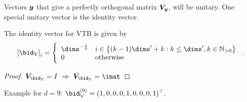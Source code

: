 Vectors $\bm{y}$ that give a perfectly orthogonal matrix $\bm{V}_{\bm{y}}$, will be unitary.
One special unitary vector is the identity vector.
\begin{corollary}
    The identity vector for VTB is given by
    \begin{equation}
        \sbr{\bid_{\ped{V}}}_i = \left\{ \begin{array}{ll}
                \dims^{-\frac{1}{4}} & i \in \cbr{(k - 1) \dims' + k : k \leq \dims', k \in \mathbb{N}_{>0}} \\
                0 & \text{otherwise}
        \end{array}\right. \text{.}
    \end{equation}
    \begin{proof}
        $\mat V_{\bid_{\ped{V}}} = I\ \Rightarrow\ \bar{\mat V}_{\bid_{\ped{V}}} = \imat$
    \end{proof}
\end{corollary}
Example for $d = 9$: $\bid_{\ped{V}}^{(9)} = (1, 0, 0, 0, 1, 0, 0, 0, 1)\Tr$.


